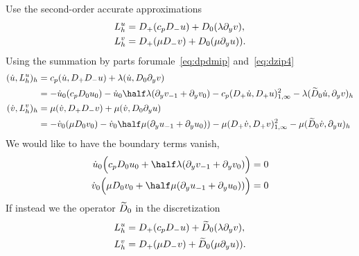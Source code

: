 Use the second-order accurate approximations
\begin{align*}
   L^u_h & = D_+( c_p D_- u) + D_0(\lambda\partial_y v), \\
   L^v_h &=  D_+( \mu D_- v) + D_0 ( \mu\partial_y u )).
\end{align*}
Using the summation by parts forumale~\eqref{eq:dpdmip} and~\eqref{eq:dzip4}
\begin{align*}
 (\ut,L^u_h)_h &=  \cp (\ut, D_+D_- u) + \lambda(\ut,D_0\vy)  \\
           &   = -\ut_0( \cp D_0 u_0 ) - \ut_0 \half\lambda(\vy_{-1} + \vy_0 ) 
                                - \cp (D_+\ut,D_+ u)_{1,\infty}^2 - \lambda (\Dz \ut,\vy)_h \\
 (\vt,L^v_h)_h &=  \mu  (\vt, D_+D_- v) + \mu    (\vt,D_0\uy)  \\
           &   = -\vt_0( \mu D_0 v_0 ) - \vt_0\half\mu( \uy_{-1}+ \uy_{0}) )
                             -\mu (D_+\vt, D_+ v)_{1,\infty}^2  - \mu (\Dz \vt,\uy)_h
\end{align*}
We would like to have the boundary terms vanish,
\begin{align*}
 \ut_0\Big( \cp D_0 u_0 + \half\lambda(\vy_{-1} + \vy_0 )\Big) &=0 \\
 \vt_0\Big( \mu D_0 v_0 + \half\mu( \uy_{-1}+ \uy_{0}) )\Big)&=0 
\end{align*}
% 
% 
If instead we the operator $\widetilde{D}_0$ in the discretization
\begin{align*}
   L^u_h & = D_+( c_p D_- u) + \widetilde{D}_0(\lambda\partial_y v), \\
   L^v_h &=  D_+( \mu D_- v) + \widetilde{D}_0 ( \mu\partial_y u )).
\end{align*}
